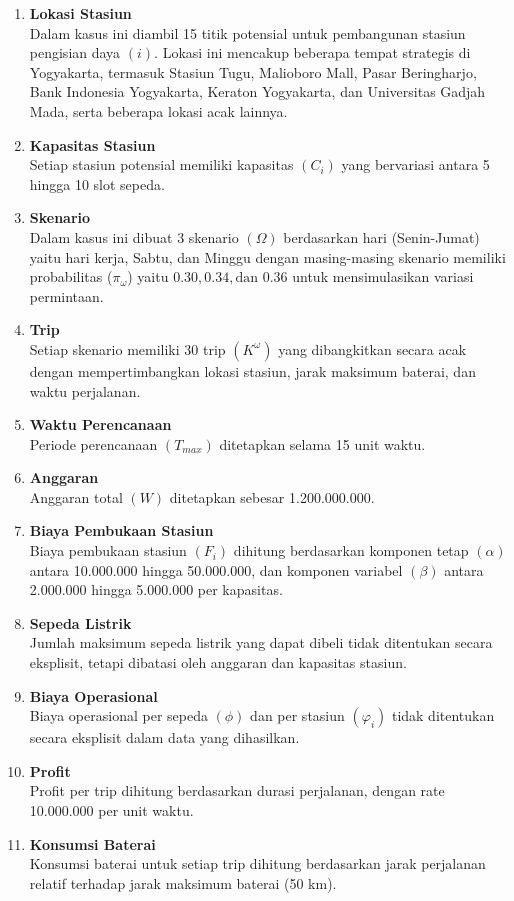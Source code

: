 \begin{enumerate}
    \item \textbf{Lokasi Stasiun}\\ Dalam kasus ini diambil 15 titik potensial untuk pembangunan stasiun pengisian daya $(i)$. Lokasi ini mencakup beberapa tempat strategis di Yogyakarta, termasuk Stasiun Tugu, Malioboro Mall, Pasar Beringharjo, Bank Indonesia Yogyakarta, Keraton Yogyakarta, dan Universitas Gadjah Mada, serta beberapa lokasi acak lainnya.
    \item \textbf{Kapasitas Stasiun}\\ Setiap stasiun potensial memiliki kapasitas $(C_i)$ yang bervariasi antara 5 hingga 10 slot sepeda.
    \item \textbf{Skenario}\\ Dalam kasus ini dibuat 3 skenario $(\Omega)$ berdasarkan hari (Senin-Jumat) yaitu hari kerja, Sabtu, dan Minggu dengan masing-masing skenario memiliki probabilitas ($\pi_{\omega}$) yaitu $0.30, 0.34, \text{dan } 0.36$ untuk mensimulasikan variasi permintaan. 
    \item \textbf{Trip}\\ Setiap skenario memiliki 30 trip $(K^\omega)$ yang dibangkitkan secara acak dengan mempertimbangkan lokasi stasiun, jarak maksimum baterai, dan waktu perjalanan.
    \item \textbf{Waktu Perencanaan}\\ Periode perencanaan $(T_{max})$ ditetapkan selama 15 unit waktu.
    \item \textbf{Anggaran}\\ Anggaran total $(W)$ ditetapkan sebesar 1.200.000.000.
    \item \textbf{Biaya Pembukaan Stasiun}\\ Biaya pembukaan stasiun $(F_i)$ dihitung berdasarkan komponen tetap $(\alpha)$ antara 10.000.000 hingga 50.000.000, dan komponen variabel $(\beta)$ antara 2.000.000 hingga 5.000.000 per kapasitas.
    \item \textbf{Sepeda Listrik}\\ Jumlah maksimum sepeda listrik yang dapat dibeli tidak ditentukan secara eksplisit, tetapi dibatasi oleh anggaran dan kapasitas stasiun.
    \item \textbf{Biaya Operasional}\\ Biaya operasional per sepeda $(\phi)$ dan per stasiun $(\varphi_i)$ tidak ditentukan secara eksplisit dalam data yang dihasilkan.
    \item \textbf{Profit}\\ Profit per trip dihitung berdasarkan durasi perjalanan, dengan rate 10.000.000 per unit waktu.
    \item \textbf{Konsumsi Baterai}\\ Konsumsi baterai untuk setiap trip dihitung berdasarkan jarak perjalanan relatif terhadap jarak maksimum baterai (50 km).
\end{enumerate}
